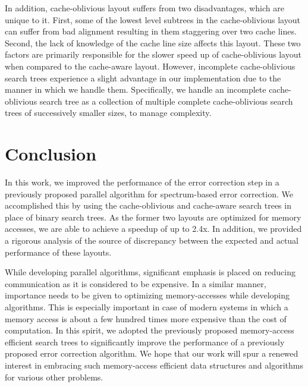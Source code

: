 \documentclass[10pt, conference]{IEEEtran}
\begin{document}
In addition, cache-oblivious layout suffers from two disadvantages, which are unique to it. First, some of the lowest level subtrees in the cache-oblivious layout can suffer from bad alignment resulting in them staggering over two cache lines. Second, the lack of knowledge of the cache line size affects this layout. These two factors are primarily responsible for the slower speed up of cache-oblivious layout when compared to the cache-aware layout. However, incomplete cache-oblivious search trees experience a slight advantage in our implementation due to the manner in which we handle them. Specifically, we handle an incomplete cache-oblivious search tree as a collection of multiple complete cache-oblivious search trees of successively smaller sizes, to manage complexity.


\section{Conclusion} \label{sec_Conclusion}
In this work, we improved the performance of the error correction step in a previously proposed parallel algorithm for spectrum-based error correction. We accomplished this by using the cache-oblivious and cache-aware search trees in place of binary search trees. As the former two layouts are optimized for memory accesses, we are able to achieve a speedup of up to 2.4x. In addition, we provided a rigorous analysis of the source of discrepancy between the expected and actual performance of these layouts. 

While developing parallel algorithms, significant emphasis is placed on reducing communication as it is considered to be expensive. In a similar manner, importance needs to be given to optimizing memory-accesses while developing algorithms. This is especially important in case of modern systems in which a memory access is about a few hundred times more expensive than the cost of computation. In this spirit, we adopted the previously proposed memory-access efficient search trees to significantly improve the performance of a previously proposed error correction algorithm. We hope that our work will spur a renewed interest in embracing such memory-access efficient data structures and algorithms for various other problems.



\end{document}
